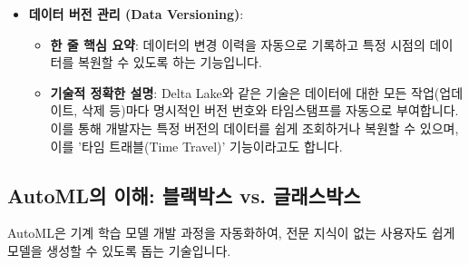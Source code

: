\documentclass[11pt,a4paper]{article}
\theoremstyle{definition}
\begin{document}
\begin{itemize}
    \item \textbf{데이터 버전 관리 (Data Versioning)}:
    \begin{itemize}
        \item \textbf{한 줄 핵심 요약}: 데이터의 변경 이력을 자동으로 기록하고 특정 시점의 데이터를 복원할 수 있도록 하는 기능입니다.
        \item \textbf{기술적 정확한 설명}: Delta Lake와 같은 기술은 데이터에 대한 모든 작업(업데이트, 삭제 등)마다 명시적인 버전 번호와 타임스탬프를 자동으로 부여합니다. 이를 통해 개발자는 특정 버전의 데이터를 쉽게 조회하거나 복원할 수 있으며, 이를 '타임 트래블(Time Travel)' 기능이라고도 합니다.
    \end{itemize}
\end{itemize}

\newpage
\subsection*{AutoML의 이해: 블랙박스 vs. 글래스박스}

AutoML은 기계 학습 모델 개발 과정을 자동화하여, 전문 지식이 없는 사용자도 쉽게 모델을 생성할 수 있도록 돕는 기술입니다.
\end{document}
